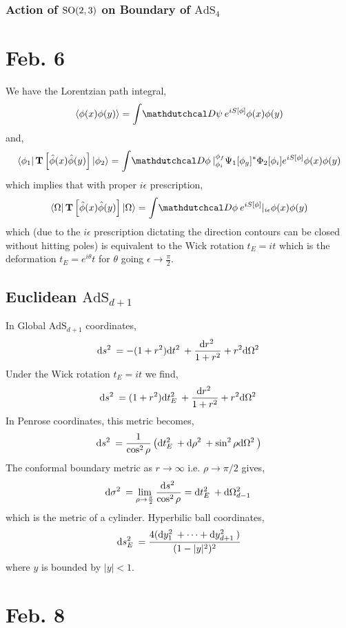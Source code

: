 \documentclass[12pt]{extarticle}
\newcommand{\AdS}[1]{\mathrm{AdS}_{#1}}
\begin{document}
\subsubsection{Action of $\mathrm{SO}(2, 3)$ on Boundary of $\AdS{4}$}

\section{Feb. 6}

We have the Lorentzian path integral,
\[  \EV{\phi(x) \phi(y)} = \int \pathd{\psi} e^{i S[\phi]} \phi(x) \phi(y) \]
and,
\[ \bra{\phi_1} \Torder{\hat{\phi}(x) \hat{\phi}(y)} \ket{\phi_2} = \int \pathd{\phi}|_{\phi_i}^{\phi_f} \Psi_1[\phi_g]^* \Phi_2[\phi_i] e^{i S[\phi]} \phi(x) \phi(y) \]
which implies that with proper $i\epsilon$ prescription,
\[ \bra{\Omega} \Torder{\hat{\phi}(x) \hat{\phi}(y)} \ket{\Omega} = \int \pathd{\phi} e^{i S[\phi]} |_{i \epsilon} \phi(x) \phi(y)  \]
which (due to the $i\epsilon$ prescription dictating the direction contours can be closed without hitting poles) is equivalent to the Wick rotation $t_E = i t$ which is the deformation $t_E = e^{i \theta} t$ for $\theta$ going $\epsilon \to \tfrac{\pi}{2}$. 

\subsection{Euclidean $\AdS{d+1}$} 

In Global $\AdS{d+1}$ coordinates,
\[ \mathrm{d}s^2 \: = - (1 + r^2) \mathrm{d}t^2 \: + \frac{\mathrm{d}r^2 \:}{1 + r^2} + r^2 \mathrm{d}\Omega^2 \: \]
Under the Wick rotation $t_E = i t$ we find,
\[ \mathrm{d}s^2 \: = (1 + r^2) \mathrm{d}t_E^2 \: + \frac{\mathrm{d}r^2 \:}{1 + r^2} + r^2 \mathrm{d}\Omega^2 \: \]
In Penrose coordinates, this metric becomes,
\[ \mathrm{d}s^2 \: = \frac{1}{\cos^2{\rho}} \left( \mathrm{d}t_E^2 \: + \mathrm{d}\rho^2 \: + \sin^2{\rho} \mathrm{d}\Omega^2 \: \right) \]
The conformal boundary metric as $r \to \infty$ i.e. $\rho \to \pi/2$ gives,
\[ \mathrm{d}\sigma^2 \: = \lim_{\rho \to \frac{\pi}{2}} \frac{\mathrm{d}s^2 \:}{\cos^2{\rho}} = \mathrm{d}t_E^2 \: + \mathrm{d}\Omega_{d-1}^2 \: \]
which is the metric of a cylinder. Hyperbilic ball coordinates,
\[ \mathrm{d}s_E^2 \: = \frac{4(\mathrm{d}y_1^2 \: + \cdots + \mathrm{d}y_{d+1}^2 \:)}{(1 - |y|^2)^2} \] 
where $y$ is bounded by $|y| < 1$. 

\section{Feb. 8}
\end{document}
